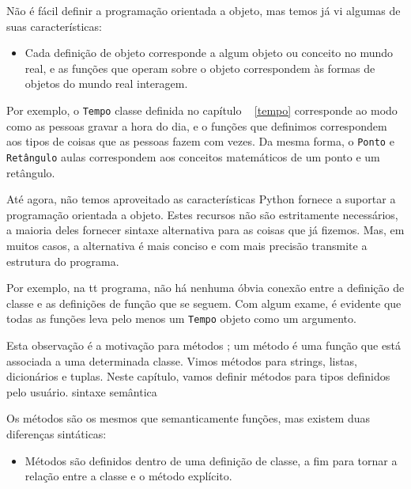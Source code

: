 \documentclass[10pt]{book}
\begin{document}
\begin{v erbatim}
{Não é fácil definir a programação orientada a objeto, mas temos
já vi algumas de suas características:

\begin{itemize}

\Programs itens são feitos de definições e função de objeto
definições, e a maior parte do cálculo é expresso em termos
de operações sobre objetos.

\item Cada definição de objeto corresponde a algum objeto ou conceito
no mundo real, e as funções que operam sobre o objeto
correspondem às formas de objetos do mundo real interagem.

\end{itemize}

Por exemplo, o {\tt Tempo} classe definida no capítulo ~ \ref {tempo}
corresponde ao modo como as pessoas gravar a hora do dia, e o
funções que definimos correspondem aos tipos de coisas que as pessoas fazem com
vezes. Da mesma forma, o {\tt Ponto} e {\tt Retângulo} aulas
correspondem aos conceitos matemáticos de um ponto e um retângulo.

Até agora, não temos aproveitado as características Python fornece a
suportar a programação orientada a objeto. Estes
recursos não são estritamente necessários, a maioria deles fornecer
sintaxe alternativa para as coisas que já fizemos. Mas, em muitos casos,
a alternativa é mais conciso e com mais precisão transmite a
estrutura do programa.

Por exemplo, na {\Tempo tt} programa, não há nenhuma óbvia
conexão entre a definição de classe e as definições de função
que se seguem. Com algum exame, é evidente que todas as funções
leva pelo menos um {\tt Tempo} objeto como um argumento.

Esta observação é a motivação para {métodos \bf}; um método é
uma função que está associada a uma determinada classe.
Vimos métodos para strings, listas, dicionários e tuplas.
Neste capítulo, vamos definir métodos para tipos definidos pelo usuário.
\index{} sintaxe
\index{} semântica

Os métodos são os mesmos que semanticamente funções, mas existem
duas diferenças sintáticas:

\begin{itemize}

\item Métodos são definidos dentro de uma definição de classe, a fim
para tornar a relação entre a classe e o método explícito.


\end{itemize}}
\end{v erbatim}
\end{document}
